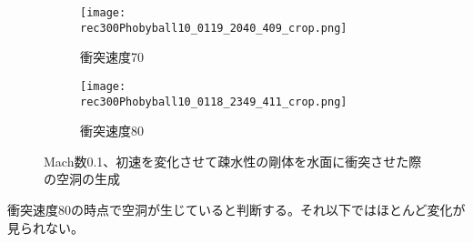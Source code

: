 \documentclass[]{jsarticle}
\begin{document}
\clearpage
\begin{figure}
\ContinuedFloat
  \begin{subfigure}{0.3\columnwidth}
  \centering
  \texttt{[image: rec300Phobyball10\_0119\_2040\_409\_crop.png]}
  \caption{衝突速度70}
  \label{fig:MSPhobyvel70}
\end{subfigure}
\begin{subfigure}{0.3\columnwidth}
  \centering
  \texttt{[image: rec300Phobyball10\_0118\_2349\_411\_crop.png]}
  \caption{衝突速度80}
  \label{fig:MSPhobyvel80}
\end{subfigure}
\caption{Mach数0.1、初速を変化させて疎水性の剛体を水面に衝突させた際の空洞の生成}
\label{fig:MachSPhoby}
\end{figure}

衝突速度80の時点で空洞が生じていると判断する。それ以下ではほとんど変化が見られない。
\end{document}
